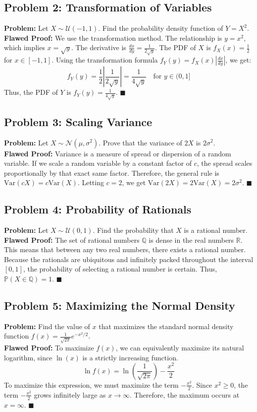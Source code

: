\documentclass[11pt, a4paper]{article}
\theoremstyle{definition}
\theoremstyle{remark}
\newcommand{\R}{\mathbb{R}}
\newcommand{\Q}{\mathbb{Q}}
\newcommand{\Prob}{\mathbb{P}}
\begin{document}
\subsection{Problem 2: Transformation of Variables}
\textbf{Problem:} Let $X \sim \mathcal{U}(-1, 1)$. Find the probability density function of $Y = X^2$. \\
\textbf{Flawed Proof:} We use the transformation method. The relationship is $y = x^2$, which implies $x = \sqrt{y}$. The derivative is $\frac{dx}{dy} = \frac{1}{2\sqrt{y}}$. The PDF of $X$ is $f_X(x) = \frac{1}{2}$ for $x \in [-1, 1]$. Using the transformation formula $f_Y(y) = f_X(x) \left| \frac{dx}{dy} \right|$, we get:
\[ f_Y(y) = \frac{1}{2} \left| \frac{1}{2\sqrt{y}} \right| = \frac{1}{4\sqrt{y}} \quad \text{for } y \in (0, 1] \]
Thus, the PDF of $Y$ is $f_Y(y) = \frac{1}{4\sqrt{y}}$. $\blacksquare$

\subsection{Problem 3: Scaling Variance}
\textbf{Problem:} Let $X \sim \mathcal{N}(\mu, \sigma^2)$. Prove that the variance of $2X$ is $2\sigma^2$. \\
\textbf{Flawed Proof:} Variance is a measure of spread or dispersion of a random variable. If we scale a random variable by a constant factor of $c$, the spread scales proportionally by that exact same factor. Therefore, the general rule is $\text{Var}(cX) = c \text{Var}(X)$. Letting $c = 2$, we get $\text{Var}(2X) = 2\text{Var}(X) = 2\sigma^2$. $\blacksquare$

\subsection{Problem 4: Probability of Rationals}
\textbf{Problem:} Let $X \sim \mathcal{U}(0,1)$. Find the probability that $X$ is a rational number. \\
\textbf{Flawed Proof:} The set of rational numbers $\Q$ is dense in the real numbers $\R$. This means that between any two real numbers, there exists a rational number. Because the rationals are ubiquitous and infinitely packed throughout the interval $[0,1]$, the probability of selecting a rational number is certain. Thus, $\Prob(X \in \Q) = 1$. $\blacksquare$

\subsection{Problem 5: Maximizing the Normal Density}
\textbf{Problem:} Find the value of $x$ that maximizes the standard normal density function $f(x) = \frac{1}{\sqrt{2\pi}} e^{-x^2/2}$. \\
\textbf{Flawed Proof:} To maximize $f(x)$, we can equivalently maximize its natural logarithm, since $\ln(x)$ is a strictly increasing function.
\[ \ln f(x) = \ln\left(\frac{1}{\sqrt{2\pi}}\right) - \frac{x^2}{2} \]
To maximize this expression, we must maximize the term $-\frac{x^2}{2}$. Since $x^2 \ge 0$, the term $-\frac{x^2}{2}$ grows infinitely large as $x \to \infty$. Therefore, the maximum occurs at $x = \infty$. $\blacksquare$
\end{document}
